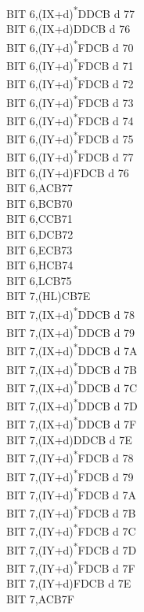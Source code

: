 \documentclass[oneside,a4paper]{book}
\begin{document}
\begin{multicols}{3}
{\begin{tabbing}
BIT 6,(IX+d)\textsuperscript{*}\>DDCB d 77\\
BIT 6,(IX+d)\>DDCB d 76\\
BIT 6,(IY+d)\textsuperscript{*}\>FDCB d 70\\
BIT 6,(IY+d)\textsuperscript{*}\>FDCB d 71\\
BIT 6,(IY+d)\textsuperscript{*}\>FDCB d 72\\
BIT 6,(IY+d)\textsuperscript{*}\>FDCB d 73\\
BIT 6,(IY+d)\textsuperscript{*}\>FDCB d 74\\
BIT 6,(IY+d)\textsuperscript{*}\>FDCB d 75\\
BIT 6,(IY+d)\textsuperscript{*}\>FDCB d 77\\
BIT 6,(IY+d)\>FDCB d 76\\
BIT 6,A\>CB77\\
BIT 6,B\>CB70\\
BIT 6,C\>CB71\\
BIT 6,D\>CB72\\
BIT 6,E\>CB73\\
BIT 6,H\>CB74\\
BIT 6,L\>CB75\\
BIT 7,(HL)\>CB7E\\
BIT 7,(IX+d)\textsuperscript{*}\>DDCB d 78\\
BIT 7,(IX+d)\textsuperscript{*}\>DDCB d 79\\
BIT 7,(IX+d)\textsuperscript{*}\>DDCB d 7A\\
BIT 7,(IX+d)\textsuperscript{*}\>DDCB d 7B\\
BIT 7,(IX+d)\textsuperscript{*}\>DDCB d 7C\\
BIT 7,(IX+d)\textsuperscript{*}\>DDCB d 7D\\
BIT 7,(IX+d)\textsuperscript{*}\>DDCB d 7F\\
BIT 7,(IX+d)\>DDCB d 7E\\
BIT 7,(IY+d)\textsuperscript{*}\>FDCB d 78\\
BIT 7,(IY+d)\textsuperscript{*}\>FDCB d 79\\
BIT 7,(IY+d)\textsuperscript{*}\>FDCB d 7A\\
BIT 7,(IY+d)\textsuperscript{*}\>FDCB d 7B\\
BIT 7,(IY+d)\textsuperscript{*}\>FDCB d 7C\\
BIT 7,(IY+d)\textsuperscript{*}\>FDCB d 7D\\
BIT 7,(IY+d)\textsuperscript{*}\>FDCB d 7F\\
BIT 7,(IY+d)\>FDCB d 7E\\
BIT 7,A\>CB7F\\

\end{tabbing}}
\end{multicols}
\end{document}
